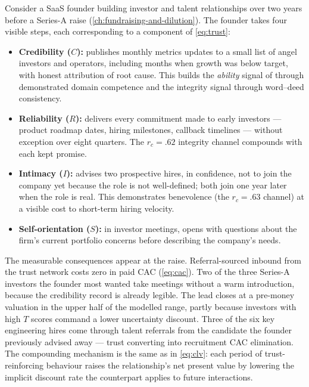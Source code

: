 \begin{example}
Consider a SaaS founder building investor and talent relationships over two years before
a Series-A raise (\cref{ch:fundraising-and-dilution}). The founder takes four visible
steps, each corresponding to a component of \cref{eq:trust}:

\begin{itemize}
  \item \textbf{Credibility (\(C\)):} publishes monthly metrics updates to a small list
    of angel investors and operators, including months when growth was below target, with
    honest attribution of root cause. This builds the \emph{ability} signal of
    \textcite{mayer1995model} through demonstrated domain competence and the integrity
    signal through word--deed consistency.
  \item \textbf{Reliability (\(R\)):} delivers every commitment made to early investors
    --- product roadmap dates, hiring milestones, callback timelines --- without exception
    over eight quarters. The \(r_c = .62\) integrity channel \parencite{colquitt2007meta}
    compounds with each kept promise.
  \item \textbf{Intimacy (\(I\)):} advises two prospective hires, in confidence, not to
    join the company yet because the role is not well-defined; both join one year later
    when the role is real. This demonstrates benevolence (the \(r_c = .63\) channel)
    at a visible cost to short-term hiring velocity.
  \item \textbf{Self-orientation (\(S\)):} in investor meetings, opens with questions
    about the firm's current portfolio concerns before describing the company's needs.
\end{itemize}

The measurable consequences appear at the raise. Referral-sourced inbound from the trust
network costs zero in paid CAC (\cref{eq:cac}). Two of the three Series-A investors the
founder most wanted take meetings without a warm introduction, because the credibility
record is already legible. The lead closes at a pre-money valuation in the upper half of
the modelled range, partly because investors with high \(T\) scores command a lower
uncertainty discount. Three of the six key engineering hires come through talent referrals
from the candidate the founder previously advised away --- trust converting into recruitment
CAC elimination. The compounding mechanism is the same as in \cref{eq:clv}: each period
of trust-reinforcing behaviour raises the relationship's net present value by lowering
the implicit discount rate the counterpart applies to future interactions.
\end{example}
